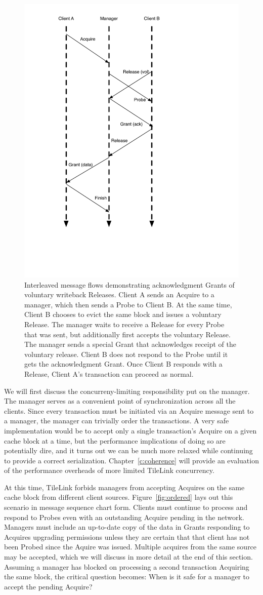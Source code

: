\begin{figure}[!p]
\centering
\includegraphics[width=0.5\columnwidth]{tilelink/figures/rel-merge.pdf}
\caption[Interleaved and well-ordered voluntary writeback message flows.]{
Interleaved message flows demonstrating acknowledgment Grants of voluntary writeback Releases.
Client A sends an Acquire to a manager, which then sends a Probe to Client B.
At the same time, Client B chooses to evict the same block and issues a voluntary Release.
The manager waits to receive a Release for every Probe that was sent, but additionally first accepts the voluntary Release.
The manager sends a special Grant that acknowledges receipt of the voluntary release.
Client B does not respond to the Probe until it gets the acknowledgment Grant.
Once Client B responds with a Release, Client A's transaction can proceed as normal.
}
\label{fig:rel-merge}
\end{figure}

We will first discuss the concurreny-limiting responsibility put on the manager.
The manager serves as a convenient point of synchronization across all the clients.
Since every transaction must be initiated via an Acquire message sent to a manager, the manager can trivially order the transactions.
A very safe implementation would be to accept only a single transaction's Acquire on a given cache block at a time,
but the performance implications of doing so are potentially dire, and it turns out we can be much more relaxed while continuing to provide a correct serialization.
Chapter~\ref{c:coherence} will provide an evaluation of the performance overheads of more limited TileLink concurrency.

At this time, TileLink forbids managers from accepting Acquires on the same cache block from different client sources.
Figure~\ref{fig:ordered} lays out this scenario in message sequence chart form.
Clients must continue to process and respond to Probes even with an outstanding Acquire pending in the network.
Managers must include an up-to-date copy of the data in Grants responding to Acquires upgrading permissions unless they are certain that that
client has not been Probed since the Aquire was issued.
Multiple acquires from the same source may be accepted, which we will discuss in more detail at the end of this section.
Assuming a manager has blocked on processing a second transaction Acquiring the same block, the critical question becomes: When is it safe for a manager to accept the pending Acquire?

